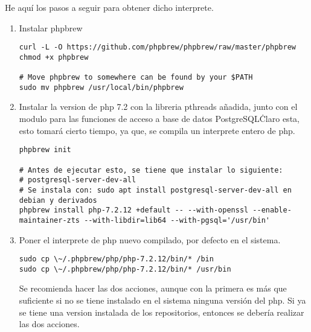 \documentclass{article}
\begin{document}
He aquí los pasos a seguir para obtener dicho interprete.

\begin{enumerate}
    \item Instalar phpbrew
    \begin{lstlisting}[frame=single]
curl -L -O https://github.com/phpbrew/phpbrew/raw/master/phpbrew
chmod +x phpbrew

# Move phpbrew to somewhere can be found by your $PATH
sudo mv phpbrew /usr/local/bin/phpbrew
    \end{lstlisting}

    \item Instalar la version de php 7.2 con la libreria pthreads añadida,
          junto con el modulo para las funciones de acceso a base de datos
          PostgreSQL\. Claro esta, esto tomará cierto tiempo, ya que, se
          compila un interprete entero de php.
    \begin{lstlisting}[frame=single]
phpbrew init

# Antes de ejecutar esto, se tiene que instalar lo siguiente:
# postgresql-server-dev-all
# Se instala con: sudo apt install postgresql-server-dev-all en debian y derivados
phpbrew install php-7.2.12 +default -- --with-openssl --enable-maintainer-zts --with-libdir=lib64 --with-pgsql='/usr/bin'
    \end{lstlisting}

    \item Poner el interprete de php nuevo compilado, por defecto en el sistema.
    \begin{lstlisting}[frame=single]
sudo cp \~/.phpbrew/php/php-7.2.12/bin/* /bin
sudo cp \~/.phpbrew/php/php-7.2.12/bin/* /usr/bin
    \end{lstlisting}
    Se recomienda hacer las dos acciones, aunque con la primera es más que suficiente si no se tiene
    instalado en el sistema ninguna versión del php. Si ya se tiene una version instalada de los
    repositorios, entonces se debería realizar las dos acciones.


\end{enumerate}
\end{document}
